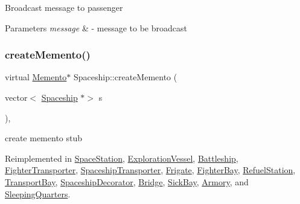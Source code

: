 Broadcast message to passenger 
\begin{DoxyParams}{Parameters}
{\em message} & -\/ message to be broadcast \\
\hline
\end{DoxyParams}
\mbox{\label{classSpaceship_a6d272f846b019dec8226ddab65648a7b}} 
\subsubsection{\texorpdfstring{create\+Memento()}{createMemento()}}
{\footnotesize\ttfamily virtual \hyperlink{classMemento}{Memento}$\ast$ Spaceship\+::create\+Memento (\begin{DoxyParamCaption}\item[{vector$<$ \hyperlink{classSpaceship}{Spaceship} $\ast$$>$}]{s }\end{DoxyParamCaption})\hspace{0.3cm}{\ttfamily [inline]}, {\ttfamily [virtual]}}

create memento stub 

Reimplemented in \hyperlink{classSpaceStation_a7396c4080f29ca9c20975f831008b011}{Space\+Station}, \hyperlink{classExplorationVessel_a90a2c653d736fadf0599af87269fa36e}{Exploration\+Vessel}, \hyperlink{classBattleship_a0e039fa419a67ff2fec0e65d93f2fefd}{Battleship}, \hyperlink{classFighterTransporter_ac20f71500dbddc40b9c6fcfd0dfd3b46}{Fighter\+Transporter}, \hyperlink{classSpaceshipTransporter_a40fe0a655d0d2d1fecadff29439b9ddd}{Spaceship\+Transporter}, \hyperlink{classFrigate_a69d6b412c52d49b55135516d3e0b2a64}{Frigate}, \hyperlink{classFighterBay_a925de99777e92d00e51e8aba09d5135c}{Fighter\+Bay}, \hyperlink{classRefuelStation_abd79d981cc7650d6417b8c8166a3fb85}{Refuel\+Station}, \hyperlink{classTransportBay_aff9390fd8b7434bfa03b408028caf920}{Transport\+Bay}, \hyperlink{classSpaceshipDecorator_a1acde91cd10517c94af41032aa5fdd9e}{Spaceship\+Decorator}, \hyperlink{classBridge_ae6e139b786743b19ec4f1762283b6fc1}{Bridge}, \hyperlink{classSickBay_a0d06ca126941dae25aaf74838dd1914b}{Sick\+Bay}, \hyperlink{classArmory_aba8aa540182986fbb0ca8a741f491ffe}{Armory}, and \hyperlink{classSleepingQuarters_ac71f6fb8b3ec0be83be6cd3c080fecc0}{Sleeping\+Quarters}.

\mbox{\label{classSpaceship_a73a1eefd211e9a2063d924ee85f0c0c7}} 
